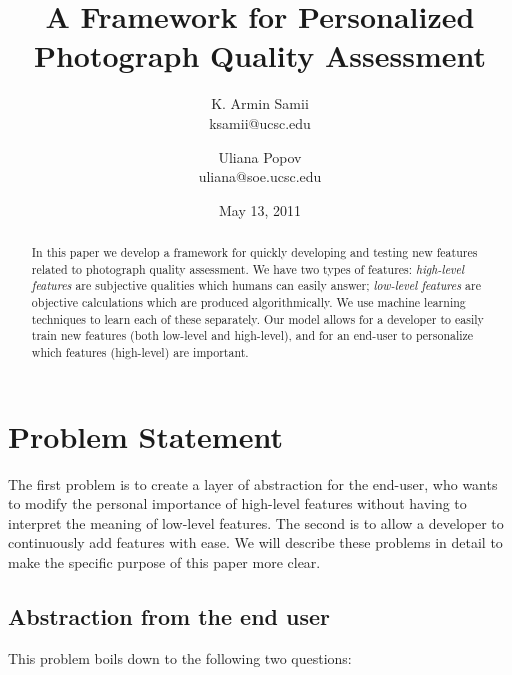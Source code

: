\documentclass[10pt,twocolumn]{article}
\title{A Framework for Personalized Photograph Quality Assessment}
\author{
K. Armin Samii \\
ksamii@ucsc.edu
\and
Uliana Popov \\
uliana@soe.ucsc.edu}
\date{May 13, 2011}
\begin{document}
\maketitle
\begin{abstract}
In this paper we develop a framework for quickly developing and testing new features related to photograph quality assessment. We have two types of features: \textit{high-level features} are subjective qualities which humans can easily answer; \textit{low-level features} are objective calculations which are produced algorithmically. We use machine learning techniques to learn each of these separately. Our model allows for a developer to easily train new features (both low-level and high-level), and for an end-user to personalize which features (high-level) are important.



\end{abstract}

\section{Problem Statement}
The first problem is to create a layer of abstraction for the end-user, who wants to modify the personal importance of high-level features without having to interpret the meaning of low-level features. The second is to allow a developer to continuously add features with ease. We will describe these problems in detail to make the specific purpose of this paper more clear.

\subsection{Abstraction from the end user}
This problem boils down to the following two questions:
\end{document}
